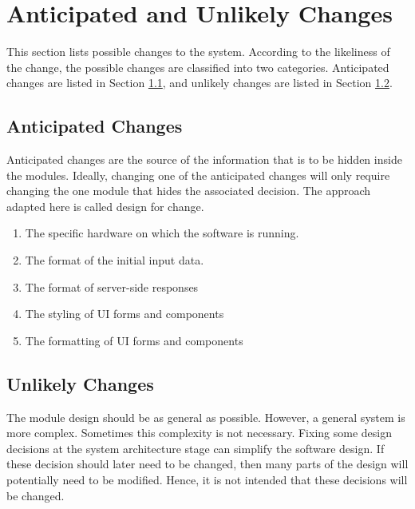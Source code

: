 \documentclass[12pt, titlepage]{article}
\begin{document}
\section{Anticipated and Unlikely Changes} \label{SecChange}

This section lists possible changes to the system. According to the likeliness of the change, the
possible changes are classified into two categories. Anticipated changes are listed in Section
\ref{SecAchange}, and unlikely changes are listed in Section \ref{SecUchange}.

\subsection{Anticipated Changes} \label{SecAchange}

Anticipated changes are the source of the information that is to be hidden inside the modules.
Ideally, changing one of the anticipated changes will only require changing the one module that
hides the associated decision. The approach adapted here is called design for change.

\begin{enumerate}[label=\textbf{AC\arabic*:},ref=AC\arabic*]
	\item \label{acHardware} The specific hardware on which the software is running.
	\item \label{acInitialInput} The format of the initial input data.
	\item \label{acServerSideResponses} The format of server-side responses
	\item \label{acStyling} The styling of UI forms and components
	\item \label{acFormatting} The formatting of UI forms and components
\end{enumerate}

\subsection{Unlikely Changes} \label{SecUchange}

The module design should be as general as possible. However, a general system is more complex.
Sometimes this complexity is not necessary. Fixing some design decisions at the system architecture
stage can simplify the software design. If these decision should later need to be changed, then
many parts of the design will potentially need to be modified. Hence, it is not intended that these
decisions will be changed.
\end{document}
